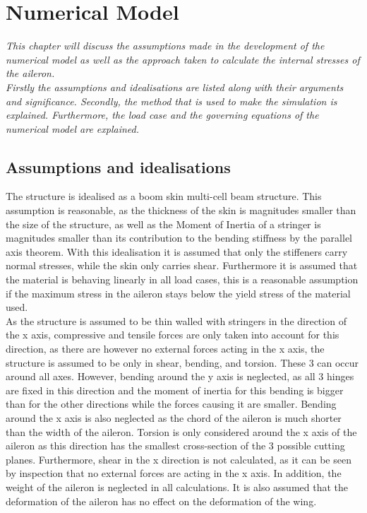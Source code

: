\section{Numerical Model}
\label{sec:numerical_model}
\textit{This chapter will discuss the assumptions made in the development of the numerical model as well as the approach taken to calculate the internal stresses of the aileron.\\
Firstly the assumptions and idealisations are listed along with their arguments and significance. Secondly, the method that is used to make the simulation is explained. Furthermore, the load case and the governing equations of the numerical model are explained.}

\subsection{Assumptions and idealisations}
\label{subsec:assumptions_numerical}
The structure is idealised as a boom skin multi-cell beam structure. This assumption is reasonable, as the thickness of the skin is magnitudes smaller than the size of the structure, as well as the Moment of Inertia of a stringer is magnitudes smaller than its contribution to the bending stiffness by the parallel axis theorem. With this idealisation it is assumed that only the stiffeners carry normal stresses, while the skin only carries shear. Furthermore it is assumed that the material is behaving linearly in all load cases, this is a reasonable assumption if the maximum stress in the aileron stays below the yield stress of the material used.\\

\noindent As the structure is assumed to be thin walled with stringers in the direction of the x axis, compressive and tensile forces are only taken into account for this direction, as there are however no external forces acting in the x axis, the structure is assumed to be only in shear, bending, and torsion. These 3 can occur around all axes. However, bending around the y axis is neglected, as all 3 hinges are fixed in this direction and the moment of inertia for this bending is bigger than for the other directions while the forces causing it are smaller. Bending around the x axis is also neglected as the chord of the aileron is much shorter than the width of the aileron. Torsion is only considered around the x axis of the aileron as this direction has the smallest cross-section of the 3 possible cutting planes. Furthermore, shear in the x direction is not calculated, as it can be seen by inspection that no external forces are acting in the x axis. In addition, the weight of the aileron is neglected in all calculations. It is also assumed that the deformation of the aileron has no effect on the deformation of the wing.

